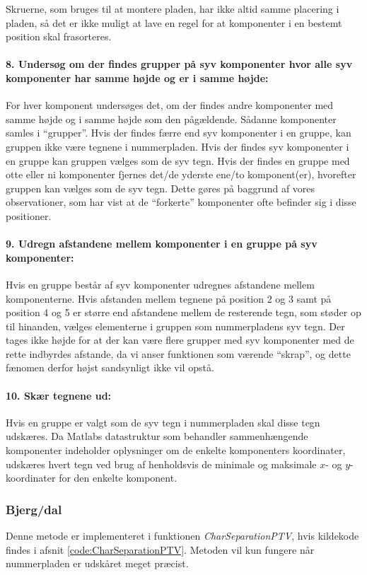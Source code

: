 Skruerne, som bruges til at montere pladen, har ikke altid samme placering i pladen, så det er ikke muligt at lave en regel for at komponenter i en bestemt position skal frasorteres.

\paragraph{8. Undersøg om der findes grupper på syv komponenter hvor alle syv komponenter har samme højde og er i samme højde:} For hver komponent undersøges det, om der findes andre komponenter med samme højde og i samme højde som den pågældende. Sådanne komponenter samles i ``grupper''. Hvis der findes færre end syv komponenter i en gruppe, kan gruppen ikke være tegnene i nummerpladen. Hvis der findes syv komponenter i en gruppe kan gruppen vælges som de syv tegn. Hvis der findes en gruppe med otte eller ni komponenter fjernes det/de yderste ene/to komponent(er), hvorefter gruppen kan vælges som de syv tegn. Dette gøres på baggrund af vores observationer, som har vist at de ``forkerte'' komponenter ofte befinder sig i disse positioner.

\paragraph{9. Udregn afstandene mellem komponenter i en gruppe på syv komponenter:} Hvis en gruppe består af syv komponenter udregnes afstandene mellem komponenterne. Hvis afstanden mellem tegnene på position 2 og 3 samt på position 4 og 5 er større end afstandene mellem de resterende tegn, som støder op til hinanden, vælges elementerne i gruppen som nummerpladens syv tegn. Der tages ikke højde for at der kan være flere grupper med syv komponenter med de rette indbyrdes afstande, da vi anser funktionen som værende ``skrap'', og dette fænomen derfor højst sandsynligt ikke vil opstå.

\paragraph{10. Skær tegnene ud:} Hvis en gruppe er valgt som de syv tegn i nummerpladen skal disse tegn udskæres. Da Matlabs datastruktur som behandler sammenhængende komponenter indeholder oplysninger om de enkelte komponenters koordinater, udskæres hvert tegn ved brug af henholdsvis de minimale og maksimale $x$- og $y$-koordinater for den enkelte komponent.

\subsubsection*{Bjerg/dal}
Denne metode er implementeret i funktionen \textit{CharSeparationPTV}, hvis kildekode findes i afsnit \vref{code:CharSeparationPTV}. Metoden vil kun fungere når nummerpladen er udskåret meget præcist.

